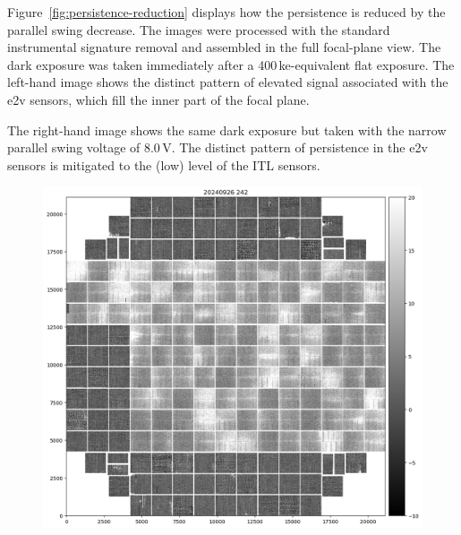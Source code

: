 Figure~\ref{fig:persistence-reduction} displays how the persistence is reduced by the
parallel swing decrease. The images were processed with the standard instrumental
signature removal and assembled in the full focal-plane view. The
dark exposure was taken immediately after a 400\,ke-equivalent flat exposure.
The left-hand image shows the distinct pattern of elevated signal associated with
the e2v sensors, which fill the inner part of the focal plane.

The right-hand image shows the same dark exposure but taken with the narrow
parallel swing voltage of 8.0\,V. The distinct pattern of persistence in the e2v sensors is mitigated to the (low) level of the 
ITL sensors.


\begin{figure}[ht]
\centering
\begin{minipage}[b]{0.45\textwidth}
\centering
\includegraphics[width=\textwidth]{figures/E1110dp93.png}
\end{minipage}
\hfill
\begin{minipage}[b]{0.45\textwidth}
\centering

\end{minipage}
\end{figure}
